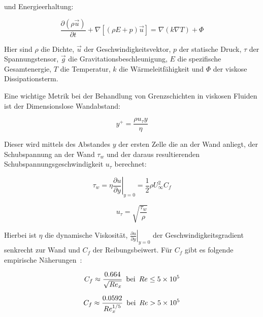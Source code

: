und Energieerhaltung:

\begin{equation}
  \label{eq:navier_energieerhaltung}
  \frac{\partial \left(\rho \vec{u}\right)}{\partial t} + \nabla \left[\left(\rho E + p\right)\vec{u}\right] = \nabla \left(k \nabla T\right) + \Phi
\end{equation}

Hier sind $\rho$ die Dichte, $\vec{u}$ der Geschwindigkeitsvektor, $p$ der statische Druck, $\tau$ der Spannungstensor,
$\vec{g}$ die Gravitationsbeschleunigung, $E$ die spezifische Gesamtenergie, $T$ die Temperatur, $k$ die Wärmeleitfähigkeit
und $\Phi$ der viskose Dissipationsterm.

Eine wichtige Metrik bei der Behandlung von Grenzschichten in viskosen Fluiden ist der Dimensionslose Wandabstand:

\begin{equation}
  \label{eq:yplus}
  y^+ = \frac{\rho u_{\tau} y}{\eta}
\end{equation}

Dieser wird mittels des Abstandes $y$ der ersten Zelle die an der Wand anliegt, der Schubspannung an der Wand $\tau_w$ und der daraus resultierenden Schubspannungsgeschwindigkeit $u_{\tau}$ berechnet:

\noindent\begin{minipage}{.5\linewidth}
  \begin{equation}
    \label{eq:schubspannung}
    \tau_w = \eta \left.\frac{\partial u}{\partial y}\right|_{y=0} = \frac{1}{2} \rho U_{\infty}^{2} C_f
  \end{equation}
\end{minipage}%
\begin{minipage}{.5\linewidth}
  \begin{equation}
    \label{eq:schubspannung_geschwindigkeit}
    u_{\tau} = \sqrt{\frac{\tau_w}{\rho}}
  \end{equation}
\end{minipage}

Hierbei ist $\eta$ die dynamische Viskosität, $\left.\frac{\partial u}{\partial y}\right|_{y=0}$ der Geschwindigkeitsgradient senkrecht zur Wand
und $C_f$ der Reibungsbeiwert.
Für $C_f$ gibt es folgende empirische Näherungen~\cite{Anderson-2017}:

\begin{minipage}{.5\linewidth}
  \begin{equation}
    \label{eq:reibungsbeiwert_laminar}
    C_f \approx \frac{0.664}{\sqrt{{Re}_x}} \hspace{0.5em} \mathrm{bei} \hspace{0.5em} Re \leq \SI{5e5}{}
  \end{equation}
\end{minipage}%
\begin{minipage}{.5\linewidth}
  \begin{equation}
    \label{eq:reibungsbeiwert_turbulent}
    C_f \approx \frac{0.0592}{{Re}_x^{1/5}} \hspace{0.5em} \mathrm{bei} \hspace{0.5em} Re > \SI{5e5}{}
  \end{equation}
\end{minipage}

